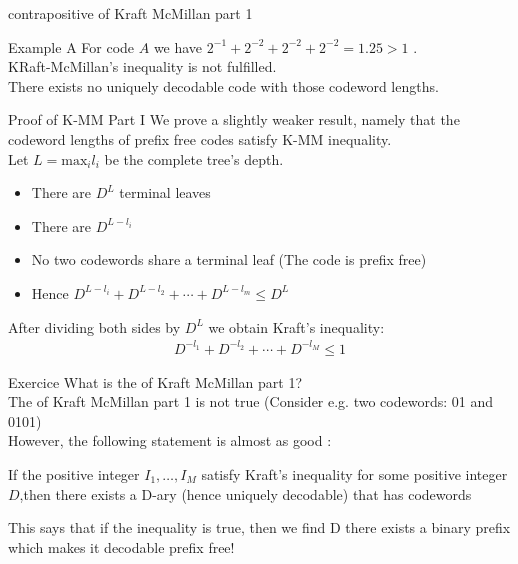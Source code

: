 \begin{parag}{contrapositive of Kraft McMillan part 1}
\begin{subparag}{Example A}
    For code $A$ we have $2^{-1} + 2^{-2} + 2^{-2} + 2^{-2} = 1.25 > 1$
    .
    \\
    KRaft-McMillan's inequality is not fulfilled. \\
    There exists no uniquely decodable code with those codeword lengths.
\end{subparag}    
\end{parag}

\begin{parag}{Proof of K-MM Part I}
    We prove a slightly weaker result, namely that the codeword lengths of prefix free codes satisfy K-MM inequality.
    \\
    Let $L = \text{max}_i l_i$ be the complete tree's depth. 
    \begin{itemize}
    \item There are $D^L$ terminal leaves
        \item There are $D^{L-l_i}$
        \item No two codewords share a terminal leaf (The code is prefix free)
        \item Hence $D^{L-l_i} + D^{L-l_2} + \cdots  + D^{L-l_m} \leq D^L$
    \end{itemize}
    After dividing both sides by $D^L$ we obtain Kraft's inequality:
    \begin{align*}
        D^{-l_1} +  D^{-l_2} + \cdots  + D^{-l_M} \leq 1
   \end{align*}
    \begin{subparag}{Exercice}
        What is the  of Kraft McMillan part 1?
        \\
        The  of Kraft McMillan part 1 is not true (Consider e.g. two codewords: 01 and 0101)
        \\
        However, the following statement is almost as good : 
        \begin{theoreme}
            If the positive integer $I_1, \dots, I_M$ satisfy Kraft's inequality for some positive integer $D$,then there exists a D-ary  (hence uniquely decodable) that has codewords
        \end{theoreme}
        
        This says that if the inequality is true, then we  find D  there exists a binary prefix which makes it decodable  prefix free!
    \end{subparag}
\end{parag}

